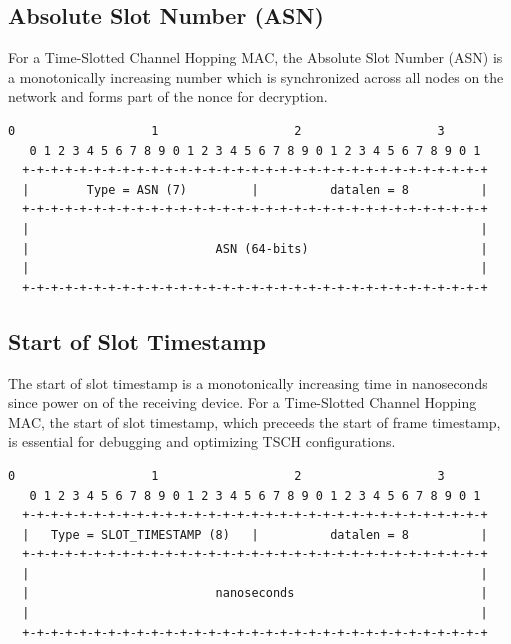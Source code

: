 \documentclass[12pt]{article}
\renewcommand\_{\textunderscore\allowbreak}
\begin{document}
\newpage
\subsection{Absolute Slot Number (ASN)}

For a Time-Slotted Channel Hopping MAC, the Absolute Slot Number (ASN)
is a monotonically increasing number which is synchronized across all nodes on
the network and forms part of the nonce for decryption.

\begin{Verbatim}[samepage=true]
   0                   1                   2                   3
   0 1 2 3 4 5 6 7 8 9 0 1 2 3 4 5 6 7 8 9 0 1 2 3 4 5 6 7 8 9 0 1
  +-+-+-+-+-+-+-+-+-+-+-+-+-+-+-+-+-+-+-+-+-+-+-+-+-+-+-+-+-+-+-+-+
  |        Type = ASN (7)         |          datalen = 8          |
  +-+-+-+-+-+-+-+-+-+-+-+-+-+-+-+-+-+-+-+-+-+-+-+-+-+-+-+-+-+-+-+-+
  |                                                               |
  |                          ASN (64-bits)                        |
  |                                                               |
  +-+-+-+-+-+-+-+-+-+-+-+-+-+-+-+-+-+-+-+-+-+-+-+-+-+-+-+-+-+-+-+-+
\end{Verbatim}

\subsection{Start of Slot Timestamp}

The start of slot timestamp is a monotonically increasing time in nanoseconds
since power on of the receiving device.  For a Time-Slotted Channel Hopping
MAC, the start of slot timestamp, which preceeds the start of frame timestamp,
is essential for debugging and optimizing TSCH configurations.

\begin{Verbatim}[samepage=true]
   0                   1                   2                   3
   0 1 2 3 4 5 6 7 8 9 0 1 2 3 4 5 6 7 8 9 0 1 2 3 4 5 6 7 8 9 0 1
  +-+-+-+-+-+-+-+-+-+-+-+-+-+-+-+-+-+-+-+-+-+-+-+-+-+-+-+-+-+-+-+-+
  |   Type = SLOT_TIMESTAMP (8)   |          datalen = 8          |
  +-+-+-+-+-+-+-+-+-+-+-+-+-+-+-+-+-+-+-+-+-+-+-+-+-+-+-+-+-+-+-+-+
  |                                                               |
  |                          nanoseconds                          |
  |                                                               |
  +-+-+-+-+-+-+-+-+-+-+-+-+-+-+-+-+-+-+-+-+-+-+-+-+-+-+-+-+-+-+-+-+
\end{Verbatim}
\end{document}
